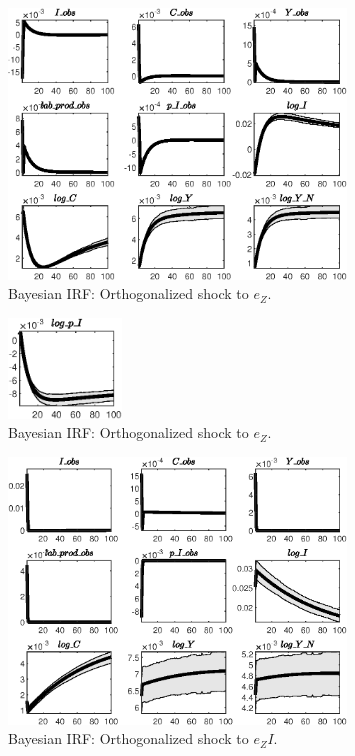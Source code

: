  
\begin{figure}[H]
\centering 
\includegraphics[width=0.80\textwidth]{BRS_extended_fd/Output/BRS_extended_fd_Bayesian_IRF_e_Z_1}
\caption{Bayesian IRF: Orthogonalized shock to ${e_Z}$.}
\label{Fig:BayesianIRF:e_Z:1}
\end{figure}
 
\begin{figure}[H]
\centering 
\includegraphics[width=0.27\textwidth]{BRS_extended_fd/Output/BRS_extended_fd_Bayesian_IRF_e_Z_2}
\caption{Bayesian IRF: Orthogonalized shock to ${e_Z}$.}
\label{Fig:BayesianIRF:e_Z:2}
\end{figure}
 
\begin{figure}[H]
\centering 
\includegraphics[width=0.80\textwidth]{BRS_extended_fd/Output/BRS_extended_fd_Bayesian_IRF_e_ZI_1}
\caption{Bayesian IRF: Orthogonalized shock to ${e_ZI}$.}
\label{Fig:BayesianIRF:e_ZI:1}
\end{figure}
 
